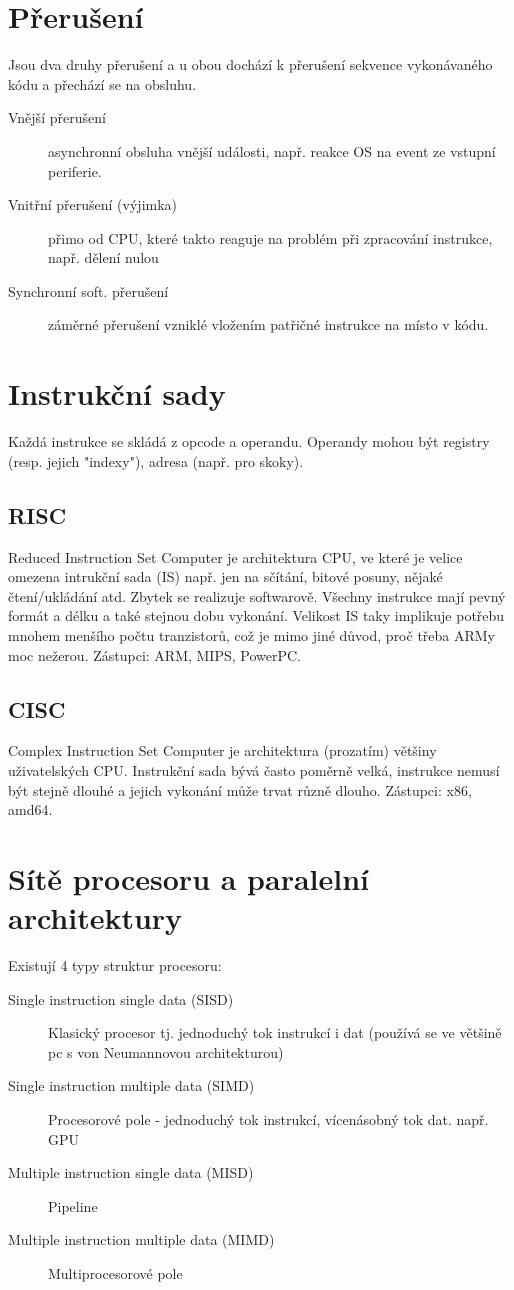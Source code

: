 \documentclass[10pt,a4paper,openright]{article}
\begin{document}
\section{Přerušení}
Jsou dva druhy přerušení a u obou dochází k přerušení sekvence vykonávaného kódu a přechází se na obsluhu.
\begin{description}
\item [Vnější přerušení] asynchronní obsluha vnější události, např. reakce OS na event ze vstupní periferie.
\item [Vnitřní přerušení (výjimka)] přimo od CPU, které takto reaguje na problém při zpracování instrukce, např. dělení nulou
\item [Synchronní soft. přerušení] záměrné přerušení vzniklé vložením patřičné instrukce na místo v kódu.
\end{description}


\section{Instrukční sady}
Každá instrukce se skládá z opcode a operandu. Operandy mohou být registry (resp. jejich "indexy"), adresa (např. pro skoky).

\subsection{RISC}
Reduced Instruction Set Computer je architektura CPU, ve které je velice omezena intrukční sada (IS) např. jen na sčítání, bitové posuny, nějaké čtení/ukládání atd. Zbytek se realizuje softwarově. Všechny instrukce mají pevný formát a délku a také stejnou dobu vykonání. Velikost IS taky implikuje potřebu mnohem menšího počtu tranzistorů, což je mimo jiné důvod, proč třeba ARMy moc nežerou. Zástupci: ARM, MIPS, PowerPC.

\subsection{CISC}
Complex Instruction Set Computer je architektura (prozatím) většiny uživatelských CPU. Instrukční sada bývá často poměrně velká, instrukce nemusí být stejně dlouhé a jejich vykonání může trvat různě dlouho. Zástupci: x86, amd64.

\section{Sítě procesoru a paralelní architektury}
Existují 4 typy struktur procesoru:
\begin{description}
\item [Single instruction single data (SISD)] Klasický procesor tj. jednoduchý tok instrukcí i dat (používá se ve většině pc s von Neumannovou architekturou)
\item [Single instruction multiple data (SIMD)] Procesorové pole - jednoduchý tok instrukcí, vícenásobný tok dat. např. GPU
\item [Multiple instruction single data (MISD)] Pipeline
\item [Multiple instruction multiple data (MIMD)] Multiprocesorové pole
\end{description}
\end{document}
